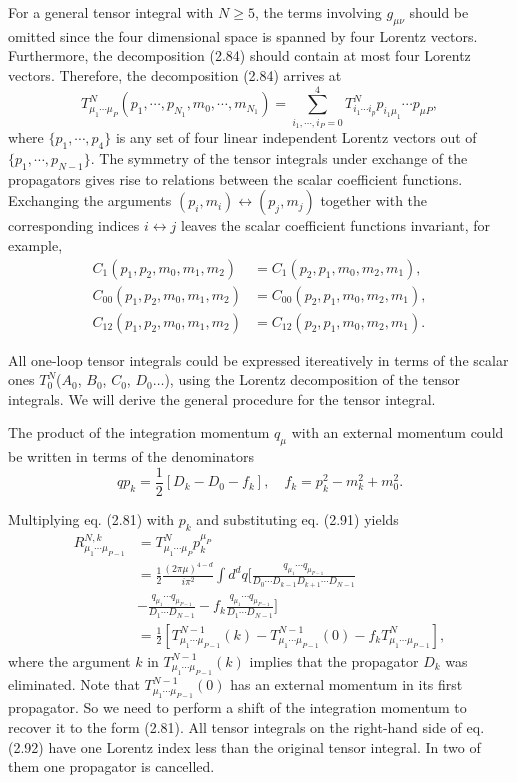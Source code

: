For a general tensor integral with $N\geq 5$, the terms involving $g_{\mu\nu}$ should be omitted since the four dimensional space is spanned by four Lorentz vectors. Furthermore, the decomposition (2.84) should contain at most four Lorentz vectors. Therefore, the decomposition (2.84) arrives at
\begin{equation}
T^N_{\mu_1\cdots\mu_P}(p_1,\cdots,p_{N_1},m_0,\cdots,m_{N_1})=\sum_{i_1,\cdots,i_P=0}^{4}T^N_{i_1\cdots i_p}p_{i_1\mu_1}\cdots p_{\mu P},
\end{equation} 
where $\{p_1,\cdots,p_4\}$ is any set of four linear independent Lorentz vectors out of $\{p_1,\cdots,p_{N-1}\}$. The symmetry of the tensor integrals under exchange of the propagators gives rise to relations between the scalar coefficient functions. Exchanging the arguments $(p_i,m_i)\leftrightarrow(p_j,m_j)$ together with the corresponding indices $i\leftrightarrow j$ leaves the scalar coefficient functions invariant, for example,
\begin{align}
C_1(p_1,p_2,m_0,m_1,m_2)&=C_1(p_2,p_1,m_0,m_2,m_1),\nonumber\\
C_{00}(p_1,p_2,m_0,m_1,m_2)&=C_{00}(p_2,p_1,m_0,m_2,m_1),\nonumber\\
C_{12}(p_1,p_2,m_0,m_1,m_2)&=C_{12}(p_2,p_1,m_0,m_2,m_1).
\end{align}

All one-loop tensor integrals could be expressed itereatively in terms of the scalar ones $T^N_0$($A_0$, $B_0$, $C_0$, $D_0$$\dots$), using the Lorentz decomposition of the tensor integrals. We will derive the general procedure for the tensor integral.

The product of the integration momentum $q_\mu$ with an external momentum could be written in terms of the denominators
\begin{equation}
qp_k=\frac{1}{2}[D_k-D_0-f_k],\quad f_k=p^2_k-m^2_k+m^2_0.
\end{equation}

Multiplying eq. (2.81) with $p_k$ and substituting eq. (2.91) yields
\begin{align}
R^{N,k}_{\mu_1\cdots \mu_{P-1}}&=T^N_{\mu_1\cdots\mu_P}p^{\mu_P}_k\nonumber\\
&=\frac{1}{2}\frac{(2\pi\mu)^{4-d}}{i\pi^2}\int d^dq\biggl[  \frac{q_{\mu_1}\cdots q_{\mu_{P-1}}}{D_0\cdots D_{k-1}D_{k+1}\cdots D_{N-1}}\nonumber\\
&-\frac{q_{\mu_1}\cdots q_{\mu_{P-1}}}{D_1\cdots D_{N-1}}-f_k \frac{q_{\mu_1}\cdots q_{\mu_{P-1}}}{D_1\cdots D_{N-1}}\biggr]\nonumber\\
&=\frac{1}{2}[T^{N-1}_{\mu_1\cdots \mu_{P-1}}(k)-T^{N-1}_{\mu_1\cdots \mu_{P-1}}(0)-f_k T^{N}_{\mu_1\cdots \mu_{P-1}}],
\end{align}
where the argument $k$ in $T^{N-1}_{\mu_1\cdots \mu_{P-1}}(k)$ implies that the propagator $D_k$ was eliminated. Note that $T^{N-1}_{\mu_1\cdots \mu_{P-1}}(0)$ has an external momentum in its first propagator. So we need to perform a shift of the integration momentum to recover it to the form (2.81). All tensor integrals on the right-hand side of eq. (2.92) have one Lorentz index less than the original tensor integral. In two of them one propagator is cancelled.


